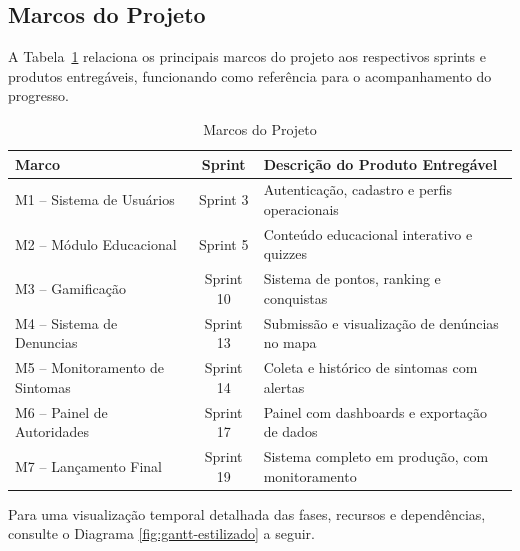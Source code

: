 \documentclass[a5paper, 12pt]{article}
\begin{document}
\subsection{Marcos do Projeto}
\label{sec:marcos}

A Tabela~\ref{tab:marcos} relaciona os principais marcos do projeto aos respectivos sprints e produtos entregáveis, funcionando como referência para o acompanhamento do progresso.

\begin{table}[h]
\centering
\caption{Marcos do Projeto}
\label{tab:marcos}
\begin{tabular}{|l|c|l|}
\hline
\textbf{Marco} & \textbf{Sprint} & \textbf{Descrição do Produto Entregável} \\
\hline
M1 – Sistema de Usuários & Sprint 3 & Autenticação, cadastro e perfis operacionais \\
M2 – Módulo Educacional & Sprint 5 & Conteúdo educacional interativo e quizzes \\
M3 – Gamificação & Sprint 10 & Sistema de pontos, ranking e conquistas \\
M4 – Sistema de Denuncias & Sprint 13 & Submissão e visualização de denúncias no mapa \\
M5 – Monitoramento de Sintomas & Sprint 14 & Coleta e histórico de sintomas com alertas \\
M6 – Painel de Autoridades & Sprint 17 & Painel com dashboards e exportação de dados \\
M7 – Lançamento Final & Sprint 19 & Sistema completo em produção, com monitoramento \\
\hline
\end{tabular}
\end{table}

\noindent Para uma visualização temporal detalhada das fases, recursos e dependências, consulte o Diagrama \ref{fig:gantt-estilizado} a seguir.

\end{document}

